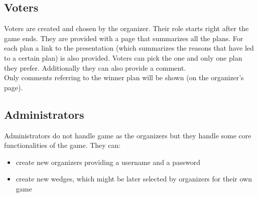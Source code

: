 \subsection{Voters}
Voters are created and chosen by the organizer. Their role starts right after the game ends. They are provided with a page that summarizes all the plans. For each plan a link to the presentation (which summarizes the reasons that have led to a certain plan) is also provided. Voters can pick the one and only one plan they prefer. Additionally they can also provide a comment.\\
Only comments referring to the winner plan will be shown (on the organizer's page).

\subsection{Administrators}
Administrators do not handle game as the organizers but they handle some core functionalities of the game. They can:
	\begin{itemize}
		\item create new organizers providing a username and a password
		\item create new wedges, which might be later selected by organizers for their own game
	\end{itemize}
  
  
  